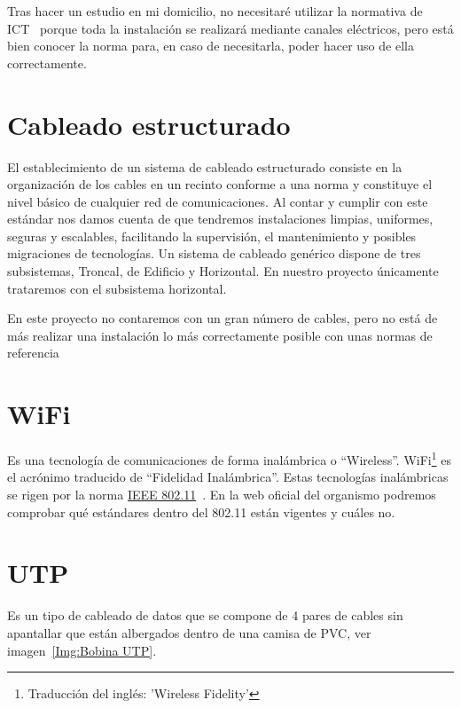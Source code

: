 Tras hacer un estudio en mi domicilio, no necesitaré utilizar la normativa de ICT~\cite{manual:ICT} porque toda la instalación se realizará mediante canales eléctricos, pero está bien conocer la norma para, en caso de necesitarla, poder hacer uso de ella correctamente.

\section{Cableado estructurado}
El establecimiento de un sistema de cableado estructurado consiste en la organización de los cables en un recinto conforme a una norma y constituye el nivel básico de cualquier red de comunicaciones.
Al contar y cumplir con este estándar nos damos cuenta de que tendremos instalaciones limpias, uniformes, seguras y escalables, facilitando la supervisión, el mantenimiento y posibles migraciones de tecnologías.
Un sistema de cableado genérico dispone de tres subsistemas, Troncal, de Edificio y Horizontal. En nuestro proyecto únicamente trataremos con el subsistema horizontal.

En este proyecto no contaremos con un gran número de cables, pero no está de más realizar una instalación lo más correctamente posible con unas normas de referencia

\section{WiFi}
Es una tecnología de comunicaciones de forma inalámbrica o “Wireless”. WiFi\footnote{Traducción del inglés: 'Wireless Fidelity'} es el acrónimo traducido de “Fidelidad Inalámbrica”.
Estas tecnologías inalámbricas se rigen por la norma \underline{IEEE 802.11}~\cite{manual:IEEE802.11}.
En la web oficial del organismo podremos comprobar qué estándares dentro del 802.11 están vigentes y cuáles no.

\section{UTP}
Es un tipo de cableado de datos que se compone de 4 pares de cables sin apantallar que están albergados dentro de una camisa de PVC, ver imagen~\ref{Img:Bobina UTP}.

